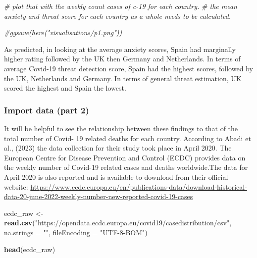 \documentclass[
]{article}
\newenvironment{Shaded}{\begin{snugshade}}{\end{snugshade}}
\newcommand{\AttributeTok}[1]{\textcolor[rgb]{0.13,0.29,0.53}{#1}}
\newcommand{\CommentTok}[1]{\textcolor[rgb]{0.56,0.35,0.01}{\textit{#1}}}
\newcommand{\FunctionTok}[1]{\textcolor[rgb]{0.13,0.29,0.53}{\textbf{#1}}}
\newcommand{\NormalTok}[1]{#1}
\newcommand{\OtherTok}[1]{\textcolor[rgb]{0.56,0.35,0.01}{#1}}
\newcommand{\StringTok}[1]{\textcolor[rgb]{0.31,0.60,0.02}{#1}}
\begin{document}
\begin{Shaded}
\begin{Highlighting}[]
\CommentTok{\# plot that with the weekly count cases of c{-}19 for each country. }
\CommentTok{\# the mean anxiety and threat score for each country as a whole needs to be calculated. }
\end{Highlighting}
\end{Shaded}

\begin{Shaded}
\begin{Highlighting}[]
\CommentTok{\#ggsave(here("visualisations/p1.png"))}
\end{Highlighting}
\end{Shaded}

As predicted, in looking at the average anxiety scores, Spain had
marginally higher rating followed by the UK then Germany and
Netherlands. In terms of average Covid-19 threat detection score, Spain
had the highest scores, followed by the UK, Netherlands and Germany. In
terms of general threat estimation, UK scored the highest and Spain the
lowest.

\subsubsection{Import data (part 2)}\label{import-data-part-2}

It will be helpful to see the relationship between these findings to
that of the total number of Covid- 19 related deaths for each country.
According to Abadi et al., (2023) the data collection for their study
took place in April 2020. The European Centre for Disease Prevention and
Control (ECDC) provides data on the weekly number of Covid-19 related
cases and deaths worldwide.The data for April 2020 is also reported and
is available to download from their official website:
\url{https://www.ecdc.europa.eu/en/publications-data/download-historical-data-20-june-2022-weekly-number-new-reported-covid-19-cases}

\begin{Shaded}
\begin{Highlighting}[]
\NormalTok{ecdc\_raw }\OtherTok{\textless{}{-}} \FunctionTok{read.csv}\NormalTok{(}\StringTok{"https://opendata.ecdc.europa.eu/covid19/casedistribution/csv"}\NormalTok{, }\AttributeTok{na.strings =} \StringTok{""}\NormalTok{, }\AttributeTok{fileEncoding =} \StringTok{"UTF{-}8{-}BOM"}\NormalTok{)}

\FunctionTok{head}\NormalTok{(ecdc\_raw)}
\end{Highlighting}
\end{Shaded}
\end{document}
